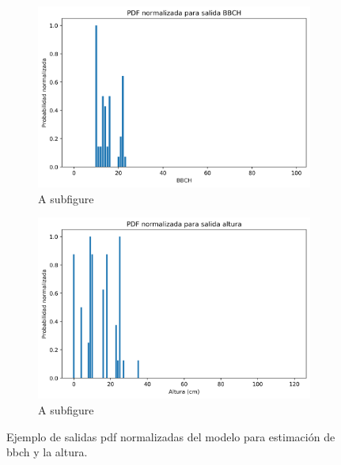 \begin{figure}[h]
\centering
\begin{subfigure}{0.8\textwidth}
  \centering
  \includegraphics[width=0.9\linewidth]{archivos/tfg/Mean/TEST_PARC_PDF_BH_B}
  \caption{A subfigure}
  \label{fig:sub1}
\end{subfigure}
\begin{subfigure}{0.8\textwidth}
  \centering
  \includegraphics[width=0.9\linewidth]{archivos/tfg/Mean/TEST_PARC_PDF_BH_H}
  \caption{A subfigure}
  \label{fig:sub2}
\end{subfigure}
\caption{Ejemplo de salidas \gls{pdf} normalizadas del modelo para estimación de \gls{bbch} y la altura. \label{fig:pdf_bh}}
\end{figure}

